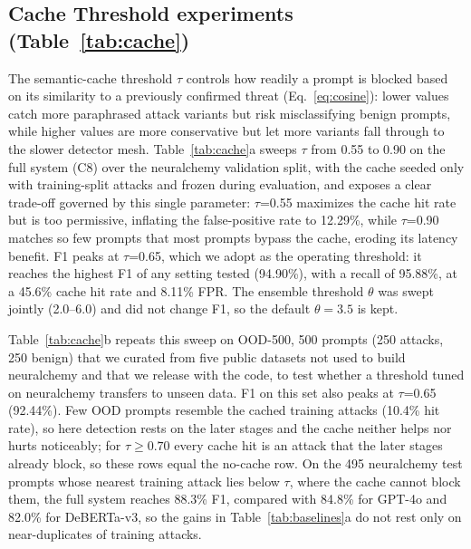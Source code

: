 \documentclass[runningheads]{llncs}
\newif\ifrev
\newcommand{\rev}[1]{\ifrev\hl{#1}\else#1\fi}                  %
\begin{document}
\subsection{Cache Threshold experiments (Table~\ref{tab:cache})}
The semantic-cache threshold $\tau$
controls how readily a prompt is blocked based on its similarity to a previously confirmed threat (Eq.~\eqref{eq:cosine}): lower values catch more paraphrased attack variants but risk misclassifying benign prompts, while higher values are more conservative but let more variants fall through to the slower detector mesh. Table~\ref{tab:cache}a sweeps $\tau$
from \rev{0.55 to 0.90} on the full system (C8) over the neuralchemy \rev{validation split, with the cache seeded only with training-split attacks and frozen during evaluation,} and exposes a clear trade-off governed by this single parameter: \rev{$\tau$=0.55} maximizes the cache hit rate but is too permissive, inflating the false-positive rate to \rev{12.29\%}, while
\rev{$\tau$=0.90} \rev{matches so few prompts} that most prompts bypass the cache, eroding its latency benefit. F1 peaks at
\rev{$\tau$=0.65}, which we adopt as the operating threshold: it reaches the highest F1 \rev{of any setting tested} (\rev{94.90\%}), \rev{with a recall of 95.88\%}, at a \rev{45.6\%} cache hit rate and \rev{8.11\%} FPR. \rev{The ensemble threshold $\theta$ was swept jointly (2.0--6.0) and did not change F1, so the default $\theta=3.5$ is kept.}

Table~\ref{tab:cache}b repeats this sweep on \rev{OOD-500, 500 prompts (250 attacks, 250 benign) that we curated from five public datasets not used to build neuralchemy and that we release with the code,} to test whether a threshold tuned on neuralchemy transfers to unseen data. \rev{F1 on this set also peaks at $\tau$=0.65 (92.44\%). Few OOD prompts resemble the cached training attacks (10.4\% hit rate), so here detection rests on the later stages and the cache neither helps nor hurts noticeably; for $\tau\geq0.70$ every cache hit is an attack that the later stages already block, so these rows equal the no-cache row. On the 495 neuralchemy test prompts whose nearest training attack lies below $\tau$, where the cache cannot block them, the full system reaches 88.3\% F1, compared with 84.8\% for GPT-4o and 82.0\% for DeBERTa-v3, so the gains in Table~\ref{tab:baselines}a do not rest only on near-duplicates of training attacks.}
\end{document}
